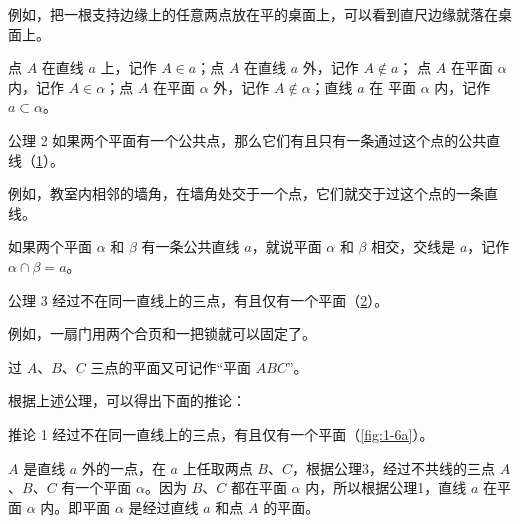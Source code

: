 例如，把一根支持边缘上的任意两点放在平的桌面上，可以看到直尺边缘就落在桌面上。

点 $A$ 在直线 $a$ 上，记作 $A\in a$；点 $A$ 在直线 $a$ 外，记作 $A \not\in a$；
点 $A$ 在平面 $\alpha$ 内，记作 $A\in\alpha$；点 $A$ 在平面 $\alpha$ 外，记作 $A \not\in\alpha$；直线 $a$ 在 平面 $\alpha$ 内，记作 $a\subset \alpha$。

\begin{Theorem}{公理 2}
  如果两个平面有一个公共点，那么它们有且只有一条通过这个点的公共直线（\cref{fig:1-4}）。
\end{Theorem}
\begin{figure}
  \caption{}\label{fig:1-4}
\end{figure}

例如，教室内相邻的墙角，在墙角处交于一个点，它们就交于过这个点的一条直线。


如果两个平面 $\alpha$ 和 $\beta$ 有一条公共直线 $a$，就说平面 $\alpha$ 和 $\beta$ 相交，交线是 $a$，记作 $\alpha \cap \beta =a$。

\begin{Theorem}{公理 3}
  经过不在同一直线上的三点，有且仅有一个平面（\cref{fig:1-5}）。
\end{Theorem}
\begin{figure}
  \caption{}\label{fig:1-5}
\end{figure}
例如，一扇门用两个合页和一把锁就可以固定了。

过 $A$、$B$、$C$ 三点的平面又可记作“平面 $ABC$”。

根据上述公理，可以得出下面的推论：
\begin{Deduction}{推论 1}
  经过不在同一直线上的三点，有且仅有一个平面（\cref{fig:1-6a}）。
\end{Deduction}
\begin{figure}
  \begin{minipage}{0.32\linewidth}\centering
    \subcaption{}\label{fig:1-6a}
  \end{minipage}
  \begin{minipage}{0.32\linewidth}\centering
    \subcaption{}\label{fig:1-6b}
  \end{minipage}
  \begin{minipage}{0.32\linewidth}\centering
    \subcaption{}\label{fig:1-6c}
  \end{minipage}
  \caption{}\label{fig:1-6}
\end{figure}

$A$ 是直线 $a$ 外的一点，在 $a$ 上任取两点 $B$、$C$，根据公理3，经过不共线的三点 $A$、$B$、$C$ 有一个平面 $\alpha$。因为 $B$、$C$ 都在平面 $\alpha$ 内，所以根据公理1，直线 $a$ 在平面 $\alpha$ 内。即平面 $\alpha$ 是经过直线 $a$ 和点 $A$ 的平面。


